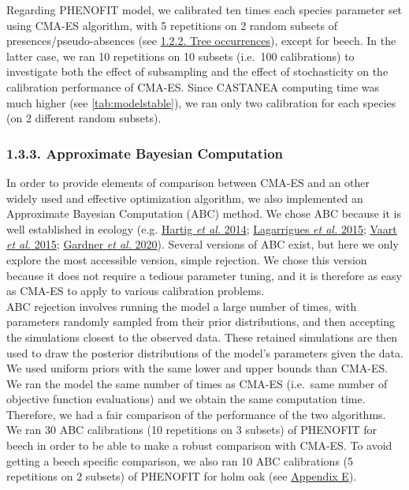 \documentclass[11pt,]{article}
\begin{document}
Regarding PHENOFIT model, we calibrated ten times each species parameter
set using CMA-ES algorithm, with 5 repetitions on 2 random subsets of
presences/pseudo-absences (see \protect\hyperlink{occurrencedata}{1.2.2.
Tree occurrences}), except for beech. In the latter case, we ran 10
repetitions on 10 subsets (i.e.~100 calibrations) to investigate both
the effect of subsampling and the effect of stochasticity on the
calibration performance of CMA-ES. Since CASTANEA computing time was
much higher (see \autoref{tab:modelstable}), we ran only two calibration
for each species (on 2 different random subsets).

\hypertarget{approximate-bayesian-computation}{%
\subsubsection{1.3.3. Approximate Bayesian
Computation}\label{approximate-bayesian-computation}}

In order to provide elements of comparison between CMA-ES and an other
widely used and effective optimization algorithm, we also implemented an
Approximate Bayesian Computation (ABC) method. We chose ABC because it
is well established in ecology (e.g.
\protect\hyperlink{ref-Hartig2014}{Hartig \emph{et al.} 2014};
\protect\hyperlink{ref-Lagarrigues2015}{Lagarrigues \emph{et al.} 2015};
\protect\hyperlink{ref-Vaart2015}{Vaart \emph{et al.} 2015};
\protect\hyperlink{ref-Gardner2020}{Gardner \emph{et al.} 2020}).
Several versions of ABC exist, but here we only explore the most
accessible version, simple rejection. We chose this version because it
does not require a tedious parameter tuning, and it is therefore as easy
as CMA-ES to apply to various calibration problems.\\
ABC rejection involves running the model a large number of times, with
parameters randomly sampled from their prior distributions, and then
accepting the simulations closest to the observed data. These retained
simulations are then used to draw the posterior distributions of the
model's parameters given the data. We used uniform priors with the same
lower and upper bounds than CMA-ES. We ran the model the same number of
times as CMA-ES (i.e.~same number of objective function evaluations) and
we obtain the same computation time. Therefore, we had a fair comparison
of the performance of the two algorithms.\\
We ran 30 ABC calibrations (10 repetitions on 3 subsets) of PHENOFIT for
beech in order to be able to make a robust comparison with CMA-ES. To
avoid getting a beech specific comparison, we also ran 10 ABC
calibrations (5 repetitions on 2 subsets) of PHENOFIT for holm oak (see
\protect\hyperlink{appendixE}{Appendix E}).
\end{document}
